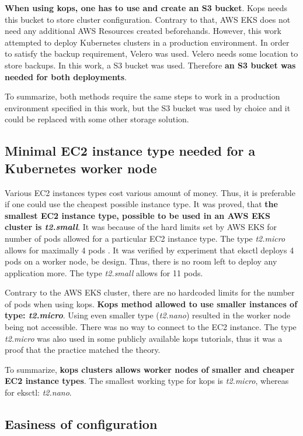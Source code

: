 \textbf{When using kops, one has to use and create an S3 bucket}. Kops needs this bucket to store cluster configuration. Contrary to that, AWS EKS does not need any additional AWS Resources created beforehands. However, this work attempted to deploy Kubernetes clusters in a production environment. In order to satisfy the backup requirement, Velero was used. Velero needs some location to store backups. In this work, a S3 bucket was used. Therefore \textbf{an S3 bucket was needed for both deployments}.

To summarize, both methods require the same steps to work in a production environment specified in this work, but the S3 bucket was used by choice and it could be replaced with some other storage solution.

\subsection{Minimal EC2 instance type needed for a Kubernetes worker node}
Various EC2 instances types cost various amount of money. Thus, it is preferable if one could use the cheapest possible instance type. It was proved, that \textbf{the smallest EC2 instance type, possible to be used in an AWS EKS cluster is \textit{t2.small}}. It was because of the hard limits set by AWS EKS for number of pods allowed for a particular EC2 instance type. The type \textit{t2.micro} allows for maximally 4 pods \cite{eks-hard-limits}. It was verified by experiment that eksctl deploys 4 pods on a worker node, be design. Thus, there is no room left to deploy any application more. The type \textit{t2.small} allows for 11 pods.

Contrary to the AWS EKS cluster, there are no hardcoded limits for the number of pods when using kops. \textbf{Kops method allowed to use smaller instances of type: \textit{t2.micro}}. Using even smaller type (\textit{t2.nano}) resulted in the worker node being not accessible. There was no way to connect to the EC2 instance. The type \textit{t2.micro} was also used in some publicly available kops tutorials, thus it was a proof that the practice matched the theory.

To summarize, \textbf{kops clusters allows worker nodes of smaller and cheaper EC2 instance types}. The smallest working type for kops is \textit{t2.micro}, whereas for eksctl: \textit{t2.nano}.

\subsection{Easiness of configuration}

